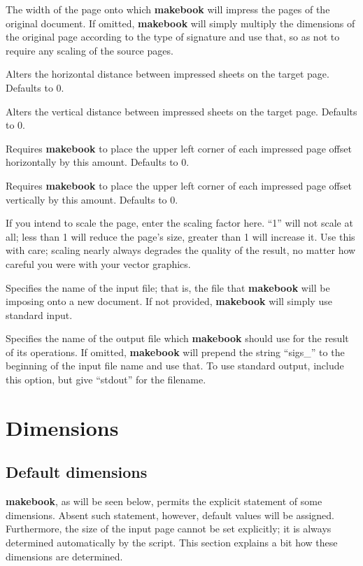 \documentclass[12pt,twoside,final]{extarticle}
\begin{document}
\begin{description}[noitemsep]
\item[-w \emph{width of target page}]The width of the page onto which \textbf{makebook} will impress the pages of the original document. If omitted, \textbf{makebook} will simply multiply the dimensions of the original page according to the type of signature and use that, so as not to require any scaling of the source pages.
\item[-d \emph{horiz. delta}]Alters the horizontal distance between impressed sheets on the target page. Defaults to 0.
\item[-D \emph{vert. delta}]Alters the vertical distance between impressed sheets on the target page. Defaults to 0.
\item[-m \emph{horiz. offset}]Requires \textbf{makebook} to place the upper left corner of each impressed page offset horizontally by this am\-ount. Defaults to 0.
\item[-M \emph{vert. offset}]Requires \textbf{makebook} to place the upper left corner of each impressed page offset vertically by this amount. Defaults to 0.
\item[-s \emph{scale}]If you intend to scale the page, enter the scaling factor here. ``1'' will not scale at all; less than 1 will reduce the page's size, greater than 1 will increase it. Use this with care; scaling nearly always degrades the quality of the result, no matter how careful you were with your vector graphics.
\item[-i \emph{input file}]Specifies the name of the input file; that is, the file that \textbf{makebook} will be imposing onto a new document. If not provided, \textbf{makebook} will simply use standard input.
\item[-o \emph{output file}]Specifies the name of the output file which \textbf{makebook} should use for the result of its operations. If omitted, \textbf{makebook} will prepend the string ``sigs\_'' to the beginning of the input file name and use that. To use standard output, include this option, but give ``stdout'' for the filename.
\end{description}
\section{Dimensions}
\subsection{Default dimensions}
\textbf{makebook}, as will be seen below, permits the explicit statement of some dimensions. Absent such statement, however, default values will be assigned.  Furthermore, the size of the input page cannot be set explicitly; it is always determined automatically by the script. This section explains a bit how these dimensions are determined.
\end{document}
